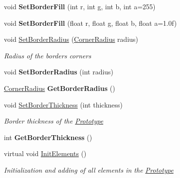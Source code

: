 \begin{DoxyCompactItemize}
void {\bfseries Set\+Border\+Fill} (int r, int g, int b, int a=255)
\item 
\mbox{\label{class_space_v_i_l_1_1_prototype_a88d87e1f140b89420ed2cdc47863fc0e}} 
void {\bfseries Set\+Border\+Fill} (float r, float g, float b, float a=1.\+0f)
\item 
void \mbox{\hyperlink{class_space_v_i_l_1_1_prototype_a8d472c2323f8c6bbdb39fb238bb6cff4}{Set\+Border\+Radius}} (\mbox{\hyperlink{class_space_v_i_l_1_1_decorations_1_1_corner_radius}{Corner\+Radius}} radius)
\begin{DoxyCompactList}\small\item\em Radius of the border\textquotesingle{}s corners \end{DoxyCompactList}\item 
\mbox{\label{class_space_v_i_l_1_1_prototype_a716d67b9dca43665a57bd649fea69820}} 
void {\bfseries Set\+Border\+Radius} (int radius)
\item 
\mbox{\label{class_space_v_i_l_1_1_prototype_a92e4a1777c159ff5e80f228c3bad181b}} 
\mbox{\hyperlink{class_space_v_i_l_1_1_decorations_1_1_corner_radius}{Corner\+Radius}} {\bfseries Get\+Border\+Radius} ()
\item 
void \mbox{\hyperlink{class_space_v_i_l_1_1_prototype_a3409ace379b42bc27dc088ea3b5d2c16}{Set\+Border\+Thickness}} (int thickness)
\begin{DoxyCompactList}\small\item\em Border thickness of the \mbox{\hyperlink{class_space_v_i_l_1_1_prototype}{Prototype}} \end{DoxyCompactList}\item 
\mbox{\label{class_space_v_i_l_1_1_prototype_a60b8f834323155b30fa65cc6cadc7919}} 
int {\bfseries Get\+Border\+Thickness} ()
\item 
virtual void \mbox{\hyperlink{class_space_v_i_l_1_1_prototype_ac3379fe02923ee155b5b0084abf27420}{Init\+Elements}} ()
\begin{DoxyCompactList}\small\item\em Initialization and adding of all elements in the \mbox{\hyperlink{class_space_v_i_l_1_1_prototype}{Prototype}} \end{DoxyCompactList}\item 

\end{DoxyCompactItemize}
